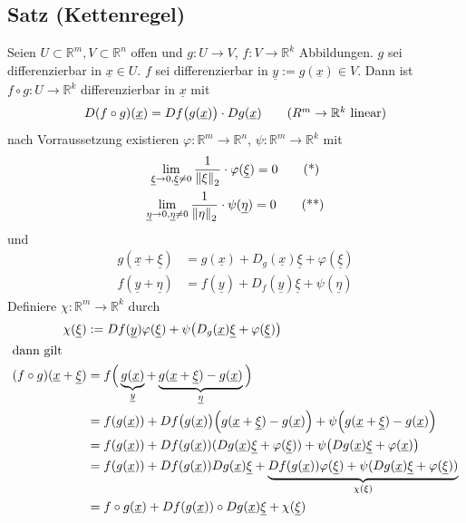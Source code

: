 \subsection[Satz: Kettenregel]{Satz (Kettenregel)} %
\label{sub:76}
Seien $U \subset \mathds{R}^m, V \subset \mathds{R}^n$ offen und $g : U \to V$, $f : V \to \mathds{R}^k$ Abbildungen. $g$ sei differenzierbar in $\underline{x} \in U$.
$f$ sei differenzierbar in $\underline{y} := g(\underline{x}) \in V$. Dann ist $f \circ g : U \to \mathds{R}^k$ differenzierbar in $\underline{x}$ mit 
\[
	D( f \circ g) (\underline{x}) = D f \big(g (\underline{x})\big) \cdot D g(\underline{x}) \tag{$R^m \to \mathds{R}^k$ linear}
\] 
nach Vorraussetzung existieren $\varphi : \mathds{R}^m \to \mathds{R}^n$, $\psi : \mathds{R}^m \to \mathds{R}^k$ mit 
\begin{gather*}
	\lim_{ \underline{\xi}   \to 0, \underline{\xi} \not= 0} \frac{1}{\norm[2]{\xi} }  \cdot \varphi( \underline{\xi} ) = 0 \tag{*}\\
	\lim_{ \underline{\eta}   \to 0, \underline{\eta} \not= 0} \frac{1}{\norm[2]{\eta} }  \cdot \psi( \underline{\eta} ) = 0 \tag{**}
\end{gather*}
und 
\begin{align*}
	g ( \underline{x} + \underline{\xi}  ) &= g (\underline{x} ) + D_g (\underline{x} )\underline{\xi} + \varphi ( \underline{\xi} ) \\
	f ( \underline{y} + \underline{\eta}  ) &= f (\underline{y} ) + D_f (\underline{y} )\underline{\xi} + \psi ( \underline{\eta} ) 
\end{align*}
Definiere $\chi : \mathds{R}^m \to \mathds{R}^k$ durch
\begin{align*}
	\chi ( \underline{\xi} ) &:= D f (\underline{y} ) \varphi( \underline{\xi} ) + \psi \big( D_g (\underline{x} ) \underline{\xi} + \varphi (\underline{\xi} ) \big) \\
	\intertext{dann gilt} (f \circ g) ( \underline{x} + \underline{\xi} ) &=  f \Big( \underbrace{g (\underline{x} )}_{\underline{y} } + \underbrace{g ( \underline{x} + \underline{\xi}  ) 
	- g (\underline{x} )}_{\underline{\eta} }  \Big) \\
	&= f ( g (\underline{x} )) + D f \big(g(\underline{x} )\big) \Big( g (\underline{x} + \underline{\xi}  ) - g(\underline{x} )  \Big) + 
	\psi  \Big( g (\underline{x} + \underline{\xi}  ) - g( \underline{x} )  \Big) \\
	&= f (g(\underline{x} )) + D f (g (\underline{x} ))  (D g (\underline{x} ) \underline{\xi} + \varphi (\underline{\xi} ) ) + 
	\psi \big(  D g (\underline{x} ) \underline{\xi} + \varphi(\underline{x} )   \big) \\
	&= f(g(\underline{x} )) + D f(g(\underline{x} )) D g(\underline{x} ) \underline{\xi} + \underbrace{D f(g(\underline{x} )) \varphi(\underline{\xi} ) + 
	\psi ( D g(\underline{x} ) \underline{\xi} + \varphi(\underline{\xi} )) }_{\chi (\xi)} \\
	&= f \circ g (\underline{x} )  + D f( g(\underline{x} )) \circ D g(\underline{x} ) \underline{\xi} + \chi (\underline{\xi} ) 
\end{align*}
